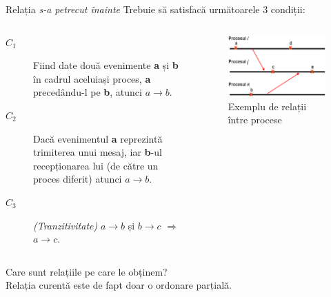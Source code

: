 \documentclass[9pt]{beamer}
\begin{document}
\begin{frame}{Relația \textit{s-a petrecut înainte}}
Trebuie să satisfacă următoarele 3 condiții:
    \begin{columns}
        \begin{column}[c]{0.70\textwidth}
            \begin{description}
            \item[$C_1$] Fiind date două evenimente \textbf{a} și \textbf{b} în cadrul aceluiași proces, \textbf{a} precedându-l pe \textbf{b}, atunci $a \rightarrow b$.
            \vskip5pt
            \item[$C_2$] Dacă evenimentul \textbf{a} reprezintă trimiterea unui mesaj, iar \textbf{b}-ul recepționarea lui (de către un proces diferit) atunci $a \rightarrow b$.
            \vskip5pt
            \item[$C_3$] \textit{(Tranzitivitate)} $a \rightarrow b$ și $b \rightarrow c$ $\Rightarrow$ $a \rightarrow c$.
        \end{description}
        \end{column}
        
        \begin{column}[c]{0.50\textwidth}
            \begin{figure}
            \includegraphics[scale=0.3]{figures/happen1}
            \caption{Exemplu de relații între procese}
            \end{figure}
        \end{column}
    \end{columns}
\vskip10pt
\centering
\Large{Care sunt relațiile pe care le obținem?\\ Relația curentă este de fapt doar o ordonare parțială.}
\end{frame}
\end{document}
